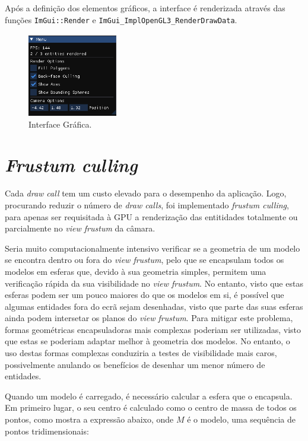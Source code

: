 \documentclass[12pt, a4paper]{article}
\begin{document}
Após a definição dos elementos gráficos, a interface é renderizada através das funções
\texttt{ImGui::Render} e \texttt{ImGui\_ImplOpenGL3\_RenderDrawData}.

\begin{figure}[H]
    \centering
    \includegraphics[width=0.35\textwidth]{res/phase2/UI.png}
    \caption{Interface Gráfica.}
\end{figure}

\section{\emph{Frustum culling}}

Cada \emph{draw call} tem um custo elevado para o desempenho da aplicação. Logo, procurando reduzir
o número de \emph{draw calls}, foi implementado \emph{frustum culling}, para apenas ser requisitada
à GPU a renderização das entitidades totalmente ou parcialmente no \emph{view frustum} da câmara.

Seria muito computacionalmente intensivo verificar se a geometria de um modelo se encontra dentro ou
fora do \emph{view frustum}, pelo que se encapsulam todos os modelos em esferas que, devido à sua
geometria simples, permitem uma verificação rápida da sua visibilidade no \emph{view frustum}. No
entanto, visto que estas esferas podem ser um pouco maiores do que os modelos em si, é possível que
algumas entidades fora do ecrã sejam desenhadas, visto que parte das suas esferas ainda podem
intersetar os planos do \emph{view frustum}. Para mitigar este problema, formas geométricas
encapsuladoras mais complexas poderiam ser utilizadas, visto que estas se poderiam adaptar melhor à
geometria dos modelos. No entanto, o uso destas formas complexas conduziria a testes de visibilidade
mais caros, possivelmente anulando os benefícios de desenhar um menor número de entidades.

Quando um modelo é carregado, é necessário calcular a esfera que o encapsula. Em primeiro lugar, o
seu centro é calculado como o centro de massa de todos os pontos, como mostra a expressão abaixo,
onde $M$ é o modelo, uma sequência de pontos tridimensionais:
\end{document}
